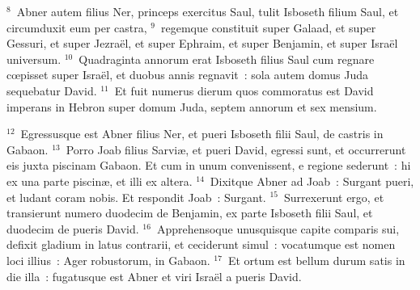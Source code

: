${}^{8}$~Abner autem filius Ner, princeps exercitus Saul, tulit Isboseth filium Saul, et circumduxit eum per castra,
${}^{9}$~regemque constituit super Galaad, et super Gessuri, et super Jezra\"el, et super Ephraim, et super Benjamin, et super Isra\"el universum.
${}^{10}$~Quadraginta annorum erat Isboseth filius Saul cum regnare cœpisset super Isra\"el, et duobus annis regnavit~: sola autem domus Juda sequebatur David.
${}^{11}$~Et fuit numerus dierum quos commoratus est David imperans in Hebron super domum Juda, septem annorum et sex mensium.


${}^{12}$~Egressusque est Abner filius Ner, et pueri Isboseth filii Saul, de castris in Gabaon.
${}^{13}$~Porro Joab filius Sarvi\ae , et pueri David, egressi sunt, et occurrerunt eis juxta piscinam Gabaon. Et cum in unum convenissent, e regione sederunt~: hi ex una parte piscin\ae , et illi ex altera.
${}^{14}$~Dixitque Abner ad Joab~: Surgant pueri, et ludant coram nobis. Et respondit Joab~: Surgant.
${}^{15}$~Surrexerunt ergo, et transierunt numero duodecim de Benjamin, ex parte Isboseth filii Saul, et duodecim de pueris David.
${}^{16}$~Apprehensoque unusquisque capite comparis sui, defixit gladium in latus contrarii, et ceciderunt simul~: vocatumque est nomen loci illius~: Ager robustorum, in Gabaon.
${}^{17}$~Et ortum est bellum durum satis in die illa~: fugatusque est Abner et viri Isra\"el a pueris David.


